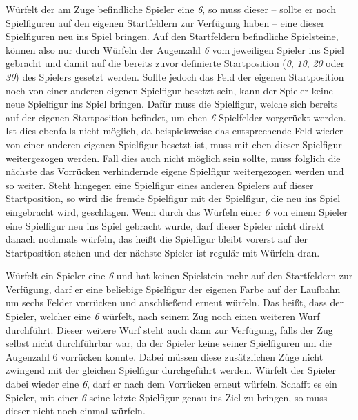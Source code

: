 Würfelt der am Zuge befindliche Spieler eine \emph{6}, so muss dieser -- sollte er noch Spielfiguren auf den eigenen Startfeldern zur Verfügung haben -- eine dieser Spielfiguren neu ins Spiel bringen. Auf den Startfeldern befindliche Spielsteine, können also nur durch Würfeln der Augenzahl \emph{6} vom jeweiligen Spieler ins Spiel gebracht und damit auf die bereits zuvor definierte Startposition (\emph{0}, \emph{10}, \emph{20} oder \emph{30}) des Spielers gesetzt werden. Sollte jedoch das Feld der eigenen Startposition noch von einer anderen eigenen Spielfigur besetzt sein, kann der Spieler keine neue Spielfigur ins Spiel bringen. Dafür muss die Spielfigur, welche sich bereits auf der eigenen Startposition befindet, um eben \emph{6} Spielfelder vorgerückt werden. Ist dies ebenfalls nicht möglich, da beispielsweise das entsprechende Feld wieder von einer anderen eigenen Spielfigur besetzt ist, muss mit eben dieser Spielfigur weitergezogen werden. Fall dies auch nicht möglich sein sollte, muss folglich die nächste das Vorrücken verhindernde eigene Spielfigur weitergezogen werden und so weiter. Steht hingegen eine Spielfigur eines anderen Spielers auf dieser Startposition, so wird die fremde Spielfigur mit der Spielfigur, die neu ins Spiel eingebracht wird, geschlagen. Wenn durch das Würfeln einer \emph{6} von einem Spieler eine Spielfigur neu ins Spiel gebracht wurde, darf dieser Spieler nicht direkt danach nochmals würfeln, das heißt die Spielfigur bleibt vorerst auf der Startposition stehen und der nächste Spieler ist regulär mit Würfeln dran.

Würfelt ein Spieler eine \emph{6} und hat keinen Spielstein mehr auf den Startfeldern zur Verfügung, darf er eine beliebige Spielfigur der eigenen Farbe auf der Laufbahn um sechs Felder vorrücken und anschließend erneut würfeln. Das heißt, dass der Spieler, welcher eine \emph{6} würfelt, nach seinem Zug noch einen weiteren Wurf durchführt. Dieser weitere Wurf steht auch dann zur Verfügung, falls der Zug selbst nicht durchführbar war, da der Spieler keine seiner Spielfiguren um die Augenzahl 6 vorrücken konnte. Dabei müssen diese zusätzlichen Züge nicht zwingend mit der gleichen Spielfigur durchgeführt werden. Würfelt der Spieler dabei wieder eine \emph{6}, darf er nach dem Vorrücken erneut würfeln. Schafft es ein Spieler, mit einer \emph{6} seine letzte Spielfigur genau ins Ziel zu bringen, so muss dieser nicht noch einmal würfeln.

